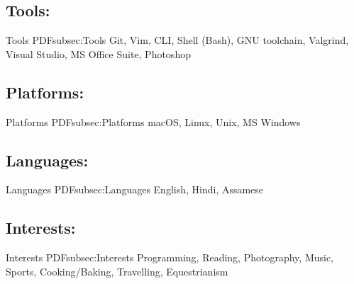\documentclass[a4paper,10pt,oneside]{article}
\begin{document}
\begin{body}
\subsection
{Tools:}
{Tools}
{PDFsubsec:Tools}
Git, Vim, CLI, Shell (Bash), GNU toolchain, Valgrind, Visual Studio, MS Office Suite, Photoshop
\vspace{15pt}
\subsection
{Platforms:}
{Platforms}
{PDFsubsec:Platforms}
macOS, Linux, Unix, MS Windows
\vspace{15pt}
\subsection
{Languages:}
{Languages}
{PDFsubsec:Languages}
English, Hindi, Assamese
\vspace{15pt}
\subsection
{Interests:}
{Interests}
{PDFsubsec:Interests}
Programming, Reading, Photography, Music, Sports, Cooking/Baking, Travelling, Equestrianism

\vspace{-5pt}
\hline





\end{body}
\end{document}
